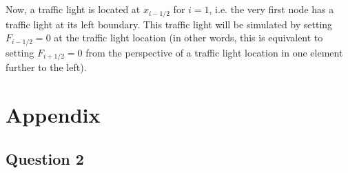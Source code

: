 \documentclass[10pt]{article}
\begin{document}
\section{}
Now, a traffic light is located at \(x_{i-1/2}\) for \(i=1\), i.e. the very first node has a traffic light at its left boundary. This traffic light will be simulated by setting \(F_{i-1/2}=0\) at the traffic light location (in other words, this is equivalent to setting \(F_{i+1/2}=0\) from the perspective of a traffic light location in one element further to the left). 





\section{Appendix}
\subsection{Question 2}
%
\end{document}

